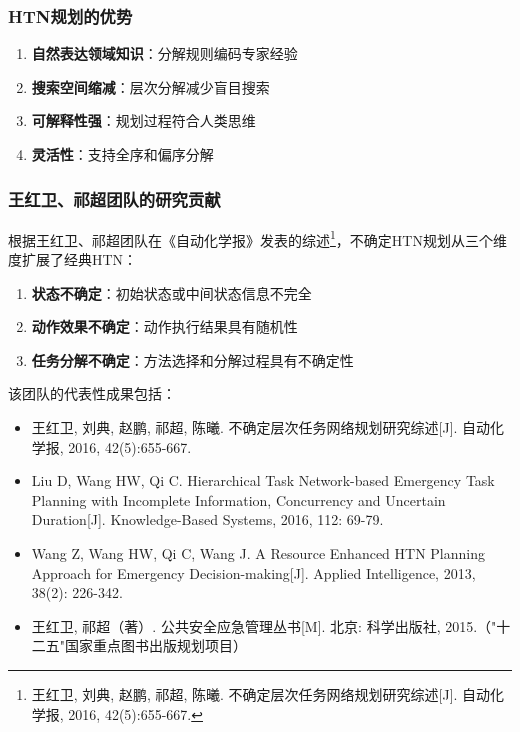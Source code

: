 \documentclass[12pt,a4paper]{ctexart}
\begin{document}
\subsubsection{HTN规划的优势}

\begin{enumerate}[leftmargin=2em]
    \item \textbf{自然表达领域知识}：分解规则编码专家经验
    \item \textbf{搜索空间缩减}：层次分解减少盲目搜索
    \item \textbf{可解释性强}：规划过程符合人类思维
    \item \textbf{灵活性}：支持全序和偏序分解
\end{enumerate}

\subsubsection{王红卫、祁超团队的研究贡献}

根据王红卫、祁超团队在《自动化学报》发表的综述\footnote{王红卫, 刘典, 赵鹏, 祁超, 陈曦. 不确定层次任务网络规划研究综述[J]. 自动化学报, 2016, 42(5):655-667.}，不确定HTN规划从三个维度扩展了经典HTN：

\begin{enumerate}[leftmargin=2em]
    \item \textbf{状态不确定}：初始状态或中间状态信息不完全
    \item \textbf{动作效果不确定}：动作执行结果具有随机性
    \item \textbf{任务分解不确定}：方法选择和分解过程具有不确定性
\end{enumerate}

该团队的代表性成果包括：
\begin{itemize}[leftmargin=2em]
    \item 王红卫, 刘典, 赵鹏, 祁超, 陈曦. 不确定层次任务网络规划研究综述[J]. 自动化学报, 2016, 42(5):655-667.
    \item Liu D, Wang HW, Qi C. Hierarchical Task Network-based Emergency Task Planning with Incomplete Information, Concurrency and Uncertain Duration[J]. Knowledge-Based Systems, 2016, 112: 69-79.
    \item Wang Z, Wang HW, Qi C, Wang J. A Resource Enhanced HTN Planning Approach for Emergency Decision-making[J]. Applied Intelligence, 2013, 38(2): 226-342.
    \item 王红卫, 祁超（著）. 公共安全应急管理丛书[M]. 北京: 科学出版社, 2015.（"十二五"国家重点图书出版规划项目）
\end{itemize}
\end{document}
